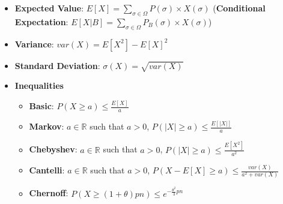 \documentclass[8pt]{extarticle}
\begin{document}
\begin{itemize}
\begin{itemize}
\begin{itemize}
        \end{itemize}
    \end{itemize}
    \item \textbf{Expected Value}: $E[X]=\displaystyle\sum_{\sigma\in\Omega} P(\sigma)\times X(\sigma)$ 
    (\textbf{Conditional Expectation}: $E[X|B]=\displaystyle\sum_{\sigma\in\Omega} P_B(\sigma)\times X(\sigma)$)
    \item \textbf{Variance}: $var(X)=E[X^2]-E[X]^2$
    \item \textbf{Standard Deviation}: $\sigma(X)=\sqrt{var(X)}$
    \item \textbf{Inequalities}
    \begin{itemize}
        \item \textbf{Basic}: $P(X\geq a)\leq \frac{E[X]}{a}$
        \item \textbf{Markov}: $a\in\mathbb{R}$ such that $a>0$, $P(|X|\geq a)\leq \frac{E[|X|]}{a}$
        \item \textbf{Chebyshev}: $a\in\mathbb{R}$ such that $a>0$, $P(|X|\geq a)\leq \frac{E[X^2]}{a^2}$
        \item \textbf{Cantelli}: $a\in\mathbb{R}$ such that $a>0$, $P(X-E[X]\geq a)\leq \frac{var(X)}{a^2+var(X)}$
        \item \textbf{Chernoff}: $P(X\geq(1+\theta)pn)\leq e^{-\frac{\theta^2}{3}pn}$
    \end{itemize}
\end{itemize}

\newpage
\end{document}
